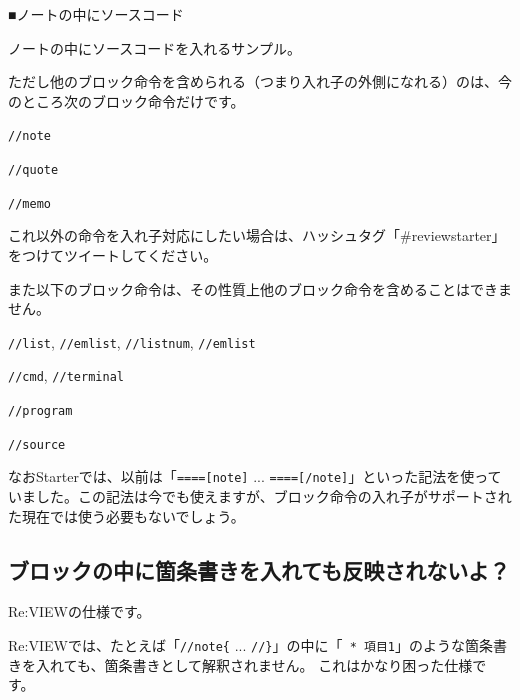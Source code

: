 \starterresult
\begin{starternote}{■ノートの中にソースコード}
\begin{starternoteinner}

ノートの中にソースコードを入れるサンプル。

\label{}
\end{starternoteinner}
\begin{starterprogram}\end{starterprogram}
\end{starternote}
\endstarterresult

ただし他のブロック命令を含められる（つまり入れ子の外側になれる）のは、今のところ次のブロック命令だけです。

\begin{starteritemize}
\item \texttt{//note}
\item \texttt{//quote}
\item \texttt{//memo}
\end{starteritemize}

これ以外の命令を入れ子対応にしたい場合は、ハッシュタグ「\#reviewstarter」をつけてツイートしてください。

また以下のブロック命令は、その性質上他のブロック命令を含めることはできません。

\begin{starteritemize}
\item \texttt{//list}, \texttt{//emlist}, \texttt{//listnum}, \texttt{//emlist}
\item \texttt{//cmd}, \texttt{//terminal}
\item \texttt{//program}
\item \texttt{//source}
\end{starteritemize}

なおStarterでは、以前は「\texttt{====[note]} ... \texttt{====[/note]}」といった記法を使っていました。この記法は今でも使えますが、ブロック命令の入れ子がサポートされた現在では使う必要もないでしょう。

\subsection{ブロックの中に箇条書きを入れても反映されないよ？}
\label{sec:2-3-2}
\label{subsec-faq-block2}

Re:VIEWの仕様です。

Re:VIEWでは、たとえば「\texttt{//note\{} ... \texttt{//\}}」の中に「\texttt{ * 項目1}」のような箇条書きを入れても、箇条書きとして解釈されません。
これはかなり困った仕様です。

